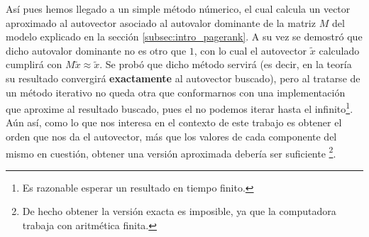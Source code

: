 \par As\'i pues hemos llegado a un simple m\'etodo n\'umerico, el cual calcula
un vector aproximado al autovector asociado al autovalor dominante de la matriz
$M$ del modelo explicado en la secci\'on \ref{subsec:intro_pagerank}. A su vez
se demostr\'o que dicho autovalor dominante no es otro que $1$, con lo cual el
autovector $\tilde{x}$ calculado cumplir\'a con $M\tilde{x}\approx\tilde{x}$. Se
prob\'o que dicho m\'etodo servir\'a (es decir, en la teor\'ia su resultado
convergir\'a \textbf{exactamente} al autovector buscado), pero al tratarse de un
m\'etodo iterativo no queda otra que conformarnos con una implementaci\'on que
aproxime al resultado buscado, pues el no podemos iterar hasta el
infinito\footnote{Es razonable esperar un resultado en tiempo finito.}. A\'un
as\'i, como lo que nos interesa en el contexto de este trabajo es obtener el
orden que nos da el autovector, m\'as que los valores de cada componente del
mismo en cuesti\'on, obtener una versi\'on aproximada deber\'ia ser suficiente
\footnote{De hecho obtener la versi\'on exacta es imposible, ya que la
computadora trabaja con aritm\'etica finita.}.
